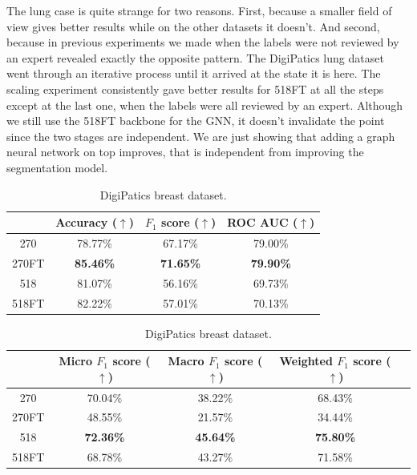 The lung case is quite strange for two reasons. First, because a smaller field of view gives better results while on the other datasets it doesn't. And second, because in previous experiments we made when the labels were not reviewed by an expert revealed exactly the opposite pattern. The DigiPatics lung dataset went through an iterative process until it arrived at the state it is here. The scaling experiment consistently gave better results for 518FT at all the steps except at the last one, when the labels were all reviewed by an expert. Although we still use the 518FT backbone for the GNN, it doesn't invalidate the point since the two stages are independent. We are just showing that adding a graph neural network on top improves, that is independent from improving the segmentation model.

\begin{table}[ht]
    \centering
    \caption{Result of the Scaling CNNs experiment.}

    \begin{tabular}{c|c|c|c|}
  \cline{2-4}
  & Accuracy ($\uparrow$) & $F_1$ score ($\uparrow$) & ROC AUC ($\uparrow$)  \\ \hline
\multicolumn{1}{|c|}{270}  & 78.77\% & 67.17\% & 79.00\% \\ \hline
\multicolumn{1}{|c|}{270FT}  & \textbf{85.46\%} & \textbf{71.65\%} & \textbf{79.90\%} \\ \hline
\multicolumn{1}{|c|}{518}  & 81.07\% & 56.16\% & 69.73\% \\ \hline
\multicolumn{1}{|c|}{518FT}  & 82.22\% & 57.01\% & 70.13\% \\ \hline
\end{tabular}
\caption{DigiPatics lung dataset.}

\vspace{0.5cm}

\begin{tabular}{c|c|c|c|c|}
  \cline{2-4}
  & Micro $F_1$ score ($\uparrow$) & Macro $F_1$ score ($\uparrow$) & Weighted $F_1$ score ($\uparrow$) \\ \hline
\multicolumn{1}{|c|}{270}  & 70.04\% & 38.22\% & 68.43\%  \\ \hline
\multicolumn{1}{|c|}{270FT}  & 48.55\% & 21.57\% & 34.44\% \\ \hline
\multicolumn{1}{|c|}{518}  & \textbf{72.36\%} & \textbf{45.64\%} & \textbf{75.80\%} \\ \hline
\multicolumn{1}{|c|}{518FT}  & 68.78\% & 43.27\% & 71.58\% \\ \hline
\end{tabular}
\caption{DigiPatics breast dataset.}


\end{table}
